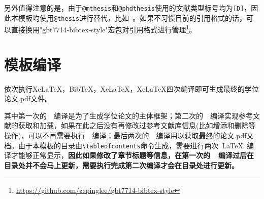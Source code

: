 另外值得注意的是，由于\verb|@mthesis|和\verb|@phdthesis|使用的文献类型标号均为\verb|[D]|，因此本模板均使用\verb|@thesis|进行替代，比如~\cite{徐泽楷2019}。如果不习惯目前的引用格式的话，可以直接换用"gbt7714-bibtex-style"宏包对引用格式进行管理\footnote{\url{https://github.com/zepinglee/gbt7714-bibtex-style}}。

\section{模板编译}
依次执行XeLaTeX，BibTeX，XeLaTeX，XeLaTeX四次编译即可生成最终的学位论文.pdf文件。

\par
其中第一次的~\XeLaTeX{}~编译是为了生成学位论文的主体框架；第二次的~\BibTeX{}~编译实现参考文献的获取和加载，如果在此之后没有再修改过参考文献库信息(比如增添和删除等操作)，可以不再需要执行~\BibTeX{}~编译；最后两次的~\XeLaTeX{}~编译用以获取最终的论文.pdf文档。由于本模板的目录由\verb|\tableofcontents|命令生成，需要进行两次~\LaTeX~编译才能够正常显示，\textbf{因此如果修改了章节标题等信息，在第一次的~\XeLaTeX{}~编译过后在目录处并不会马上更新，需要执行完成第二次编译才会在目录处进行更新。}
